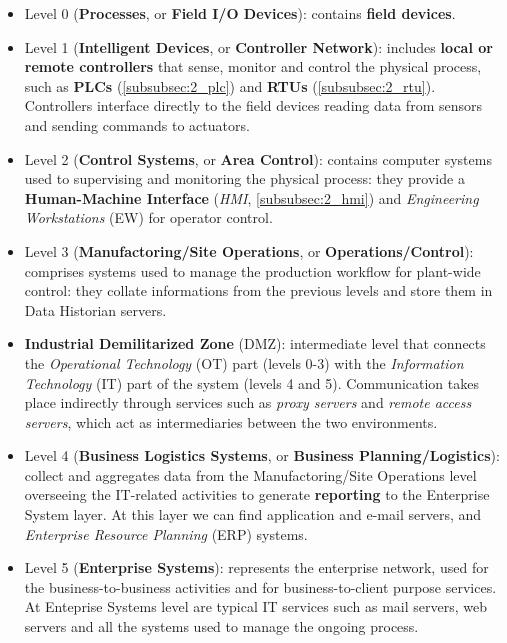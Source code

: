 \begin{itemize}
	\item Level 0 (\textbf{Processes}, or \textbf{Field I/O Devices}): contains \textbf{field devices}.
	
	\item Level 1 (\textbf{Intelligent Devices}, or \textbf{Controller Network}): includes \textbf{local or remote controllers} that sense, monitor and control the physical process, such as \textbf{PLCs} (\ref{subsubsec:2_plc}) and \textbf{RTUs} (\ref{subsubsec:2_rtu}). Controllers interface directly to the field devices reading data from sensors and sending commands to actuators.
	
	\item Level 2 (\textbf{Control Systems}, or \textbf{Area Control}): contains computer systems used to supervising and monitoring the physical process: they provide a \textbf{Human-Machine Interface} (\textit{HMI}, \ref{subsubsec:2_hmi}) and \textit{Engineering Workstations} (EW) for operator control.
	
	\item Level 3 (\textbf{Manufactoring/Site Operations}, or \textbf{Operations/Control}): comprises systems used to manage the production workflow for plant-wide control: they collate informations from the previous levels and store them in Data Historian servers.
	
	\item \textbf{Industrial Demilitarized Zone} (DMZ): intermediate level that connects the \textit{Operational Technology} (OT) part (levels 0-3) with the \textit{Information Technology} (IT) part of the system (levels 4 and 5). Communication takes place indirectly through services such as \textit{proxy servers} and \textit{remote access servers}, which act as intermediaries between the two environments.
	
	\item Level 4 (\textbf{Business Logistics Systems}, or \textbf{Business Planning/Logistics}): collect and aggregates data from the Manufactoring/Site Operations level overseeing the IT-related activities to generate \textbf{reporting} to the Enterprise System layer. At this layer we can find application and e-mail servers, and \textit{Enterprise Resource Planning} (ERP) systems.
	
	\item Level 5 (\textbf{Enterprise Systems}): represents the enterprise network, used for the business-to-business activities and for business-to-client purpose services. At Enteprise Systems level are typical IT services such as mail servers, web servers and all the systems used to manage the ongoing process.
\end{itemize}

